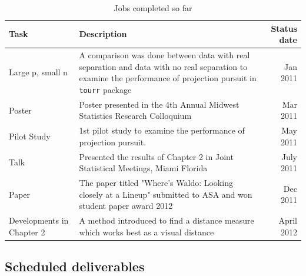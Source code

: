 \documentclass[12]{report}
\begin{document}
\begin{table}[hbtp]
\caption{Jobs completed so far}
\centering 
\begin{tabular}{|l|p{10cm}|r|} 
\hline
Task &  Description & Status date\\ %
\hline
Large p, small n & A comparison was done between data with real separation and data with no real separation to examine the performance of projection pursuit in \texttt{tourr} package \vspace{.1in} & Jan 2011 \\
Poster & Poster presented in the 4th Annual Midwest Statistics Research Colloquium\vspace{.1in} & Mar 2011 \\ 
Pilot Study & 1st pilot study to examine the performance of projection pursuit.  \vspace{.1in} & May 2011\\ 
Talk & Presented the results of Chapter 2 in Joint Statistical Meetings, Miami Florida \vspace{.1in} & July 2011 \\
Paper & The paper titled "Where's Waldo: Looking closely at a Lineup" submitted to ASA and won student paper award 2012 \vspace{.1in} & Dec 2011 \\

Developments in Chapter 2 & A method introduced to find a distance measure which works best as a visual distance \vspace{.1in} & April 2012\\
\hline
\end{tabular}
\label{tbl:cjob}
\end{table}	

\subsection{Scheduled deliverables}
\end{document}
